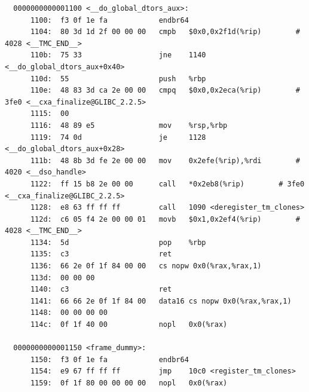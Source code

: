 \documentclass[UTF8,a4paper,10pt]{ctexart}
\begin{document}
\begin{verbatim}
  0000000000001100 <__do_global_dtors_aux>:
      1100:  f3 0f 1e fa            endbr64
      1104:  80 3d 1d 2f 00 00 00   cmpb   $0x0,0x2f1d(%rip)        # 4028 <__TMC_END__>
      110b:  75 33                  jne    1140 <__do_global_dtors_aux+0x40>
      110d:  55                     push   %rbp
      110e:  48 83 3d ca 2e 00 00   cmpq   $0x0,0x2eca(%rip)        # 3fe0 <__cxa_finalize@GLIBC_2.2.5>
      1115:  00 
      1116:  48 89 e5               mov    %rsp,%rbp
      1119:  74 0d                  je     1128 <__do_global_dtors_aux+0x28>
      111b:  48 8b 3d fe 2e 00 00   mov    0x2efe(%rip),%rdi        # 4020 <__dso_handle>
      1122:  ff 15 b8 2e 00 00      call   *0x2eb8(%rip)        # 3fe0 <__cxa_finalize@GLIBC_2.2.5>
      1128:  e8 63 ff ff ff         call   1090 <deregister_tm_clones>
      112d:  c6 05 f4 2e 00 00 01   movb   $0x1,0x2ef4(%rip)        # 4028 <__TMC_END__>
      1134:  5d                     pop    %rbp
      1135:  c3                     ret
      1136:  66 2e 0f 1f 84 00 00   cs nopw 0x0(%rax,%rax,1)
      113d:  00 00 00 
      1140:  c3                     ret
      1141:  66 66 2e 0f 1f 84 00   data16 cs nopw 0x0(%rax,%rax,1)
      1148:  00 00 00 00 
      114c:  0f 1f 40 00            nopl   0x0(%rax)
  
  0000000000001150 <frame_dummy>:
      1150:  f3 0f 1e fa            endbr64
      1154:  e9 67 ff ff ff         jmp    10c0 <register_tm_clones>
      1159:  0f 1f 80 00 00 00 00   nopl   0x0(%rax)
  

\end{verbatim}
\end{document}
